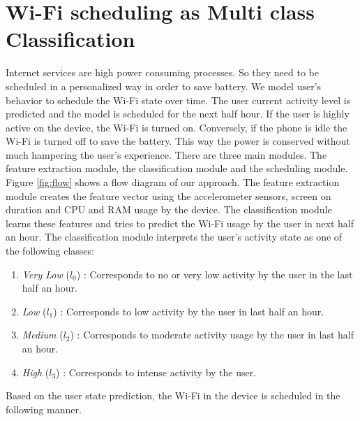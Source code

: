 \section{Wi-Fi scheduling as Multi class Classification}
Internet services are high power consuming processes. So they need to be scheduled in a personalized way in order to save battery. We model user’s behavior to schedule the Wi-Fi 
state over time. The user current activity level is predicted and the
model is scheduled for the next half hour. If the user is highly
active on the device, the Wi-Fi is turned on. Conversely, if
the phone is idle the Wi-Fi is turned off to save the battery.
This way the power is conserved without much hampering the
user’s experience. There are three main modules. The
feature extraction module, the classification module and the
scheduling module. Figure \ref{fig:flow} shows a flow diagram of
our approach. %
The feature extraction module creates the feature vector using the accelerometer sensors, screen on duration and CPU and RAM usage by the device. The classification module learns these features and tries to predict the Wi-Fi usage by the user in next half an hour. 
The classification module interprets the user's activity state as one of the following classes:

\begin{enumerate}
\item  {\em Very Low} ($l_0$) : Corresponds to no or very low activity by the user in the
last half an hour.
\item {\em Low} ($l_1$) : Corresponds to low activity  by the user
in last half an hour.
\item {\em Medium} ($l_2$) : Corresponds to moderate activity usage by the
user in last half an hour.
\item {\em High} ($l_3$) : Corresponds to intense activity  by the user.
\end{enumerate}

Based on the user state prediction, the Wi-Fi in the device is scheduled in the following manner. 


